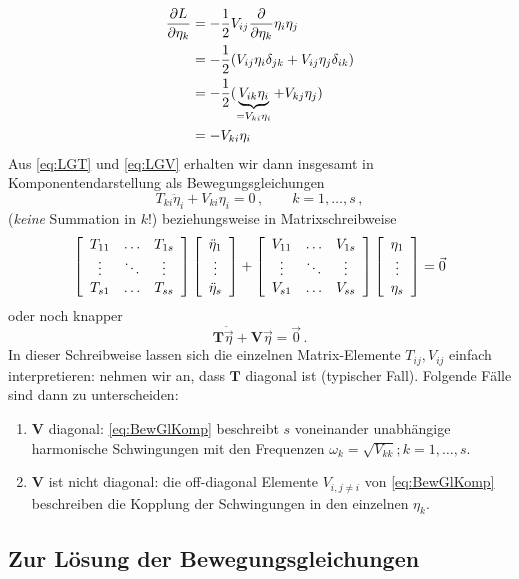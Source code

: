 \documentclass[paper=a4, fontsize=11.0pt, abstractoff, DIV12]{scrartcl}
\begin{document}
\begin{align}
\frac{\partial L}{\partial \eta_k} &= -\frac{1}{2}V_{ij}\frac{\partial }{\partial \eta_k}\eta_i\eta_j\nonumber\\
&= -\frac{1}{2}(V_{ij}\eta_i\delta_{jk} + V_{ij}\eta_j\delta_{ik})\nonumber\\
&= -\frac{1}{2}(\underbrace{V_{ik}\eta_i}_{=V_{ki}\eta_i} + V_{kj}\eta_j)\nonumber\\
&= -V_{ki}\eta_i
\label{eq:LGV}
\end{align}
Aus \eqref{eq:LGT} und \eqref{eq:LGV} erhalten wir dann insgesamt in
Komponentendarstellung als Bewegungsgleichungen
\begin{equation}
T_{ki}\ddot{\eta}_i + V_{ki}\eta_{i} = 0\, ,\qquad k=1,\dots,s\,,
\label{eq:BewGlKomp}
\end{equation}
(\emph{keine} Summation in $k$!) beziehungsweise in Matrixschreibweise
\begin{align}
\threeMatrix{T_{11}}{\dots}{T_{1s}}{\vdots}{\ddots}{\vdots}{T_{s1}}{\dots}{T_{ss}} \DreierVec{\ddot\eta_1}{\vdots}{\ddot\eta_s} +
\threeMatrix{V_{11}}{\dots}{V_{1s}}{\vdots}{\ddots}{\vdots}{V_{s1}}{\dots}{V_{ss}} \DreierVec{\eta_1}{\vdots}{\eta_s} = \vec 0
\end{align}
oder noch knapper
\begin{equation}
\mathbf{T} \ddot{\vec\eta} + \mathbf{V}{\vec\eta} = \vec 0\,.
\end{equation}
In dieser Schreibweise lassen sich die einzelnen Matrix-Elemente
$T_{ij}, V_{ij}$ einfach interpretieren: nehmen wir an, dass $\mathbf{T}$
diagonal ist (typischer Fall). Folgende Fälle sind dann zu unterscheiden:
\begin{enumerate}
    \item $\mathbf{V}$ diagonal: \eqref{eq:BewGlKomp} beschreibt $s$ voneinander
    unabhängige harmonische Schwingungen mit den Frequenzen $\omega_k = \sqrt{V_{kk}}; k=1,\dots,s$.
    \item $\mathbf{V}$ ist nicht diagonal: die off-diagonal Elemente $V_{i,j\ne i}$
    von \eqref{eq:BewGlKomp} beschreiben die Kopplung der Schwingungen in den einzelnen $\eta_k$.
\end{enumerate}

\subsection{Zur Lösung der Bewegungsgleichungen}
\end{document}
